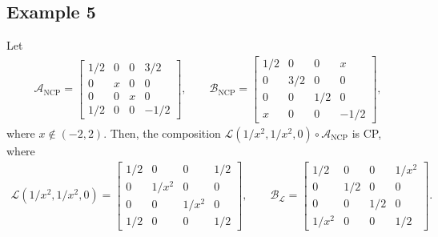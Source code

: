 \documentclass[12pt]{iopart}
\begin{document}
\subsection{Example 5}
Let
\begin{align}
\mathcal{A}_\text{NCP}=\begin{bmatrix}
1/2 &0 &0 &3/2\\
0 &x &0 &0\\
0 &0 &x &0\\
1/2 &0 &0 &-1/2
\end{bmatrix},
\qquad
\mathcal{B}_\text{NCP}=\begin{bmatrix}
1/2 &0 &0 &x\\
0 &3/2 &0 &0\\
0 &0 &1/2 &0\\
x &0 &0 &-1/2
\end{bmatrix},
\end{align}
where $x\not\in (-2,2)$. Then, the composition $\mathcal{L}(1/x^2,1/x^2, 0)\circ \mathcal{A}_\text{NCP}$ is CP, where
\begin{align}
\mathcal{L}(1/x^2,1/x^2, 0)=\begin{bmatrix}
1/2 &0 &0 &1/2\\
0 &1/x^2 &0 &0\\
0 &0 &1/x^2 &0\\
1/2 &0 &0 &1/2
\end{bmatrix},
\qquad
\mathcal{B}_\mathcal{L}=\begin{bmatrix}
1/2 &0 &0 &1/x^2\\
0 &1/2 &0 &0\\
0 &0 &1/2 &0\\
1/x^2 &0 &0 &1/2
\end{bmatrix}.
\end{align}
\end{document}
